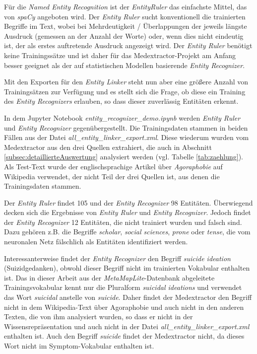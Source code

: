 Für die \emph{Named Entity Recognition} ist der \emph{EntityRuler} das einfachste Mittel, das von \emph{spaCy} angeboten wird. Der \emph{Entity Ruler} sucht konventionell die trainierten Begriffe im Text, wobei bei Mehrdeutigkeit / Überlappungen der jeweils längste Ausdruck (gemessen an der Anzahl der Worte) oder, wenn dies nicht eindeutig ist, der als erstes auftretende Ausdruck angezeigt wird. Der \emph{Entity Ruler} benötigt keine Trainingssätze und ist daher für das Medextractor-Projekt am Anfang besser geeignet als der auf statistischen Modellen basierende \emph{Entity Recognizer}.

Mit den Exporten für den \emph{Entity Linker} steht nun aber eine größere Anzahl von Trainingsätzen zur Verfügung und es stellt sich die Frage, ob diese ein Training des \emph{Entity Recognizers} erlauben, so dass dieser zuverlässig Entitäten erkennt.

In dem Jupyter Notebook \emph{entity\_recognizer\_demo.ipynb} werden \emph{Entity Ruler} und \emph{Entity Recognizer} gegenübergestellt. Die Trainingsdaten stammen in beiden Fällen aus der Datei \emph{all\_entity\_linker\_export.xml}. Diese wiederum wurden vom Medextractor aus den drei Quellen extrahiert, die auch in Abschnitt \ref{subsec:detaillierteAuswertung} analysiert werden (vgl. Tabelle \ref{tab:zaehlung}). Als Test-Text wurde der englischsprachige Artikel über \emph{Agoraphobie} auf Wikipedia verwendet, der nicht Teil der drei Quellen ist, aus denen die Trainingsdaten stammen.

Der \emph{Entity Ruler} findet 105 und der \emph{Entity Recognizer} 98 Entitäten. Überwiegend decken sich die Ergebnisse von \emph{Entity Ruler} und \emph{Entity Recognizer}. Jedoch findet der \emph{Entity Recognizer} 12 Entitäten, die nicht trainiert wurden und falsch sind. Dazu gehören z.B. die Begriffe \emph{scholar}, \emph{social sciences}, \emph{prone} oder \emph{tense}, die vom neuronalen Netz fälschlich als Entitäten identifiziert werden.

Interessanterweise findet der \emph{Entity Recognizer} den Begriff \emph{suicide ideation} (Suizidgedanken), obwohl dieser Begriff nicht im trainierten Vokabular enthalten ist. Das in dieser Arbeit aus der \emph{MetaMapLite}-Datenbank abgeleitete Trainingsvokabular kennt nur die Pluralform \emph{suicidal ideations} und verwendet das Wort \emph{suicidal} anstelle von \emph{suicide}. Daher findet der Medextractor den Begriff nicht in dem Wikipedia-Text über Agoraphobie und auch nicht in den anderen Texten, die von ihm analysiert wurden, so dass er nicht in der Wissensrepräsentation und auch nicht in der Datei \emph{all\_entity\_linker\_export.xml} enthalten ist. Auch den Begriff \emph{suicide} findet der Medextractor nicht, da dieses Wort nicht im Symptom-Vokabular enthalten ist.

